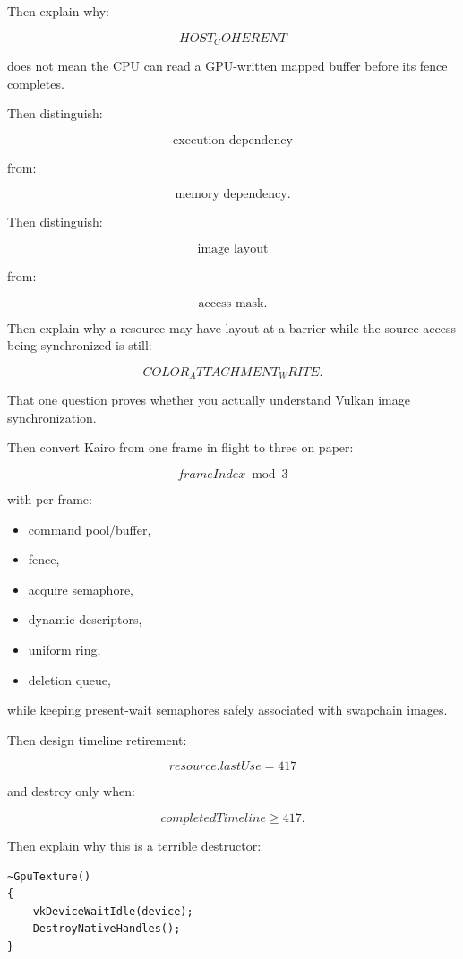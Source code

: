 Then explain why:

\[
HOST_COHERENT
\]

does not mean the CPU can read a GPU-written mapped buffer before its fence completes.

Then distinguish:

\[
\text{execution dependency}
\]

from:

\[
\text{memory dependency}.
\]

Then distinguish:

\[
\text{image layout}
\]

from:

\[
\text{access mask}.
\]

Then explain why a resource may have layout  at a barrier while the source access being synchronized is still:

\[
COLOR_ATTACHMENT_WRITE.
\]

That one question proves whether you actually understand Vulkan image synchronization.

Then convert Kairo from one frame in flight to three on paper:

\[
frameIndex\bmod3
\]

with per-frame:

\begin{itemize}
\tightlist
\item
  command pool/buffer,
\item
  fence,
\item
  acquire semaphore,
\item
  dynamic descriptors,
\item
  uniform ring,
\item
  deletion queue,
\end{itemize}

while keeping present-wait semaphores safely associated with swapchain images.

Then design timeline retirement:

\[
resource.lastUse=417
\]

and destroy only when:

\[
completedTimeline\ge417.
\]

Then explain why this is a terrible destructor:

\begin{verbatim}
~GpuTexture()
{
    vkDeviceWaitIdle(device);
    DestroyNativeHandles();
}
\end{verbatim}

